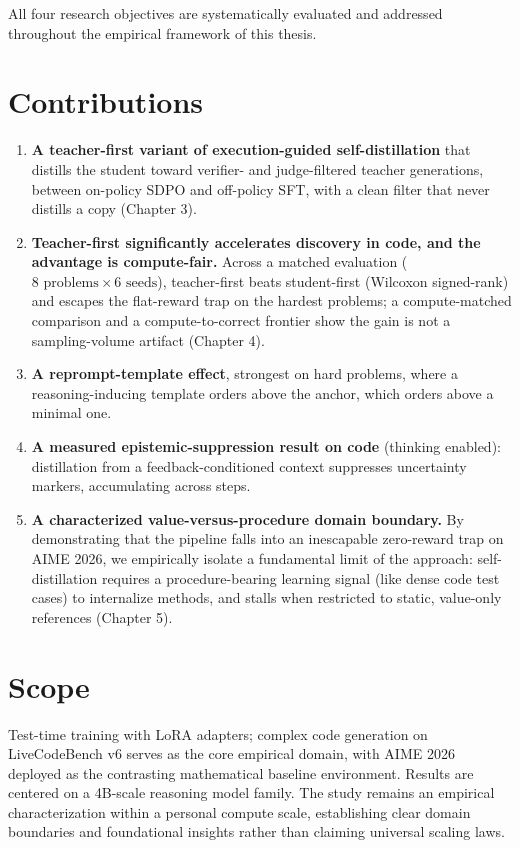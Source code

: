 \documentclass[12pt,a4paper]{report}
\providecommand{\tightlist}{\setlength{\itemsep}{0pt}\setlength{\parskip}{0pt}}
\begin{document}
All four research objectives are systematically evaluated and addressed throughout the empirical framework of this thesis.

\section{Contributions}\label{contributions}

\begin{enumerate}
\def\labelenumi{\arabic{enumi}.}
\tightlist
\item
  \textbf{A teacher-first variant of execution-guided self-distillation} that distills the student toward verifier- and judge-filtered teacher generations, between on-policy SDPO and off-policy SFT, with a clean filter that never distills a copy (Chapter 3).
\item
  \textbf{Teacher-first significantly accelerates discovery in code, and the advantage is compute-fair.} Across a matched evaluation ($8\text{ problems} \times 6\text{ seeds}$), teacher-first beats student-first (Wilcoxon signed-rank) and escapes the flat-reward trap on the hardest problems; a compute-matched comparison and a compute-to-correct frontier show the gain is not a sampling-volume artifact (Chapter 4).
\item
  \textbf{A reprompt-template effect}, strongest on hard problems, where a reasoning-inducing template orders above the anchor, which orders above a minimal one.
\item
  \textbf{A measured epistemic-suppression result on code} (thinking enabled): distillation from a feedback-conditioned context suppresses uncertainty markers, accumulating across steps.
\item
  \textbf{A characterized value-versus-procedure domain boundary.} By demonstrating that the pipeline falls into an inescapable zero-reward trap on AIME 2026, we empirically isolate a fundamental limit of the approach: self-distillation requires a procedure-bearing learning signal (like dense code test cases) to internalize methods, and stalls when restricted to static, value-only references (Chapter 5).
\end{enumerate}

\section{Scope}\label{scope}

Test-time training with LoRA adapters; complex code generation on LiveCodeBench v6 \cite{r6} serves as the core empirical domain, with AIME 2026 deployed as the contrasting mathematical baseline environment. Results are centered on a 4B-scale reasoning model family. The study remains an empirical characterization within a personal compute scale, establishing clear domain boundaries and foundational insights rather than claiming universal scaling laws.
\end{document}
